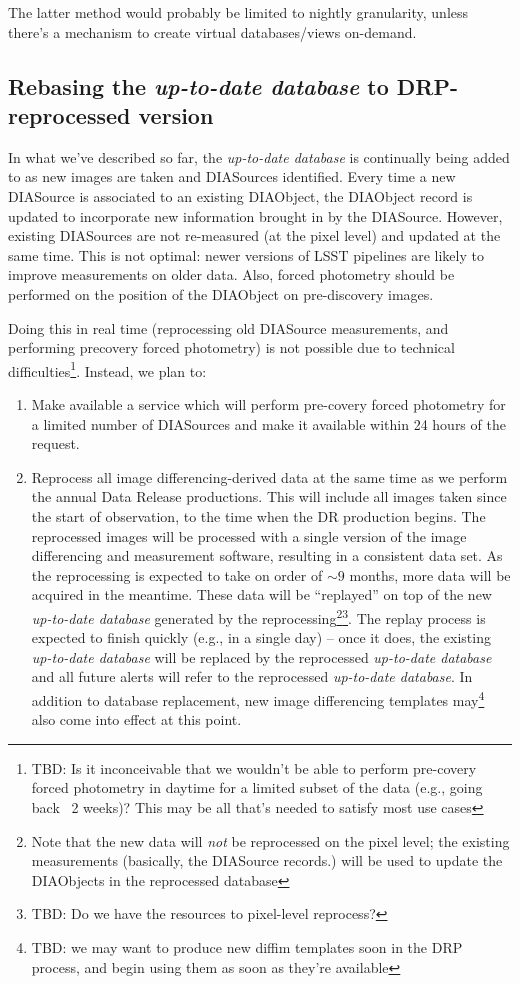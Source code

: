 \documentclass[12pt]{article}
\newcommand{\DB}{{\em up-to-date database}\xspace}
\begin{document}
The latter method would probably be limited to nightly granularity, unless there's a mechanism to create virtual databases/views on-demand.

\subsection{Rebasing the \DB to DRP-reprocessed version}

In what we've described so far, the \DB is continually being added to as new images are taken and DIASources identified. Every time a new DIASource is associated to an existing DIAObject, the DIAObject record is updated to incorporate new information brought in by the DIASource. However, existing DIASources are not re-measured (at the pixel level) and updated at the same time. This is not optimal: newer versions of LSST pipelines are likely to improve measurements on older data. Also, forced photometry should be performed on the position of the DIAObject on pre-discovery images.

Doing this in real time (reprocessing old DIASource measurements, and performing precovery forced photometry) is not possible due to technical difficulties\footnote{TBD: Is it inconceivable that we wouldn't be able to perform pre-covery forced photometry in daytime for a limited subset of the data (e.g., going back ~2 weeks)? This may be all that's needed to satisfy most use cases}. Instead, we plan to:
\begin{enumerate}
\item Make available a service which will perform pre-covery forced photometry for a limited number of DIASources and make it available within 24 hours of the request.
\item Reprocess all image differencing-derived data at the same time as we perform the annual Data Release productions. This will include all images taken since the start of observation, to the time when the DR production begins. The reprocessed images will be processed with a single version of the image differencing and measurement software, resulting in a consistent data set. As the reprocessing is expected to take on order of $\sim 9$ months, more data will be acquired in the meantime. These data will be ``replayed'' on top of the new \DB generated by the reprocessing\footnote{Note that the new data will {\em not} be reprocessed on the pixel level; the existing measurements (basically, the DIASource records.) will be used to update the DIAObjects in the reprocessed database}\footnote{TBD: Do we have the resources to pixel-level reprocess?}. The replay process is expected to finish quickly (e.g., in a single  day) -- once it does, the existing \DB will be replaced by the reprocessed \DB and all future alerts will refer to the reprocessed \DB. In addition to database replacement, new image differencing templates may\footnote{TBD: we may want to produce new diffim templates soon in the DRP process, and begin using them as soon as they're available} also come into effect at this point.
\end{enumerate}
\end{document}
